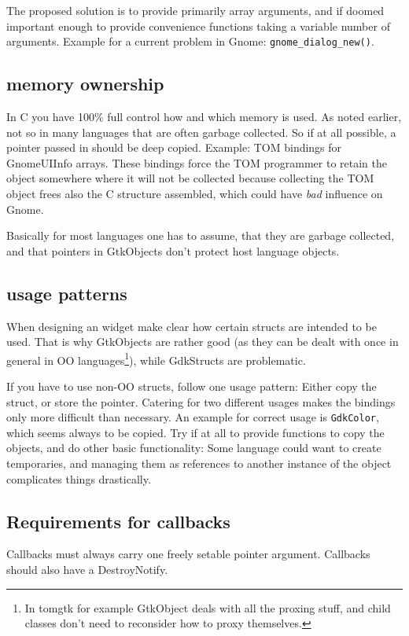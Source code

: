 \documentclass{article}
\begin{document}
The proposed solution is to provide primarily array arguments, and if
doomed important enough to provide convenience functions taking a
variable number of arguments. Example for a current problem in Gnome:
{\tt gnome\_dialog\_new()}.

\subsection{memory ownership}
In C you have 100\% full control how and which memory
    is used. As noted earlier, not so in many languages that are often
    garbage collected.
    So if at all possible, a pointer passed in should be deep copied.
    Example: TOM bindings for GnomeUIInfo arrays. These bindings force the
    TOM programmer to retain the object somewhere where it will not be
    collected because collecting the TOM object frees also the C structure
    assembled, which could have \emph{bad} influence on Gnome.

    Basically for most languages one has to assume, that they are
    garbage collected, and that pointers in GtkObjects don't protect
    host language objects. 

\subsection{usage patterns}
When designing an widget make clear how certain structs are intended
to be used. That is why GtkObjects are rather good (as they can be
dealt with once in general in OO languages\footnote{In tomgtk for
example GtkObject deals with all the proxing stuff, and child classes
don't need to reconsider how to proxy themselves.}), while GdkStructs are
problematic.

If you have to use non-OO structs, follow one usage pattern: Either
copy the struct, or store the pointer. Catering for two different
usages makes the bindings only more difficult than necessary.
An example for correct usage is {\tt GdkColor}, which seems always to
be copied. Try if at all to provide functions to copy the objects, and
do other basic functionality: Some language could want to create
temporaries, and managing them as references to another instance of
the object complicates things drastically.

\subsection{Requirements for callbacks}
Callbacks must always carry one freely setable pointer
argument. Callbacks should also have a DestroyNotify.
\end{document}

